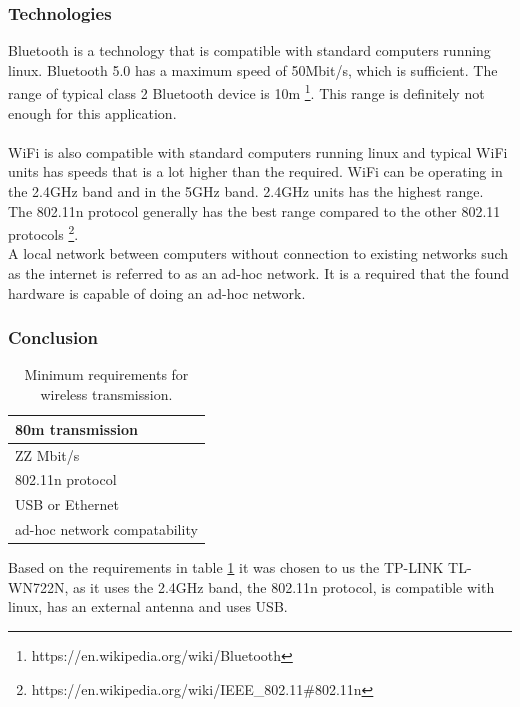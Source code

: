 \subsubsection{Technologies}
Bluetooth is a technology that is compatible with standard computers running linux. 
Bluetooth 5.0 has a maximum speed of 50Mbit/s, which is sufficient.
The range of typical class 2 Bluetooth device is 10m \footnote{https://en.wikipedia.org/wiki/Bluetooth}.
This range is definitely not enough for this application.
\\
\\  
WiFi is also compatible with standard computers running linux and typical WiFi units has speeds that is a lot higher than the required. 
WiFi can be operating in the 2.4GHz band and in the 5GHz band. 
2.4GHz units has the highest range. 
The 802.11n protocol generally has the best range compared to the other 802.11 protocols \footnote{https://en.wikipedia.org/wiki/IEEE\_802.11\#802.11n}.
\\
A local network between computers without connection to existing networks such as the internet is referred to as an ad-hoc network. 
It is a required that the found hardware is capable of doing an ad-hoc network.

\subsubsection{Conclusion} 

\begin{table}[]
\centering
\caption{Minimum requirements for wireless transmission.}
\label{tab:req_wifi}
\begin{tabular}{|l|}
\hline
80m transmission             \\ \hline
ZZ Mbit/s                    \\ \hline
802.11n protocol             \\ \hline
USB or Ethernet              \\ \hline
ad-hoc network compatability \\ \hline
\end{tabular}
\end{table}
Based on the requirements in table \ref{tab:req_wifi} it was chosen to us the TP-LINK TL-WN722N, as it uses the 2.4GHz band, the 802.11n protocol, is compatible with linux, has an external antenna and uses USB. 
